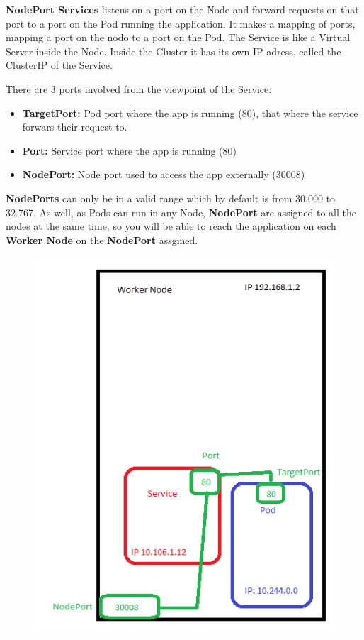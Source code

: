 \documentclass{article}
\newenvironment{blocktemplateIII}[1]{%
    \tcolorbox[beamer,%
    noparskip,breakable,
    ,colframe=Red,%
    colbacklower=LimeGreen!75!LightGreen,%
    title=#1]}%
    {\endtcolorbox}
\begin{document}
\textbf{NodePort Services} listens on a port on the Node and forward requests on that port to a port on the Pod running the application. It makes a mapping of ports, mapping a port on the nodo to a port on the Pod. The Service is like a Virtual Server inside the Node. Inside the Cluster it has its own IP adress, called the ClusterIP of the Service.

There are 3 ports involved from the viewpoint of the Service:
\begin{itemize}
    \item \textbf{TargetPort:} Pod port where the app is running (80), that where the service forwars their request to.
    \item \textbf{Port:} Service port where the app is running (80)
    \item \textbf{NodePort:} Node port used to access the app externally (30008)
\end{itemize}

\begin{blocktemplateIII}{WARNING}
\textbf{NodePorts} can only be in a valid range which by default is from 30.000 to 32.767. As well, as Pods can run in any Node, \textbf{NodePort} are assigned to all the nodes at the same time, so you will be able to reach the application on each \textbf{Worker Node} on the \textbf{NodePort} assgined.
\end{blocktemplateIII}

\begin{figure}[H]
    \centering
    \includegraphics[scale=0.5]{pictures/services3.png}
\end{figure}
\end{document}
